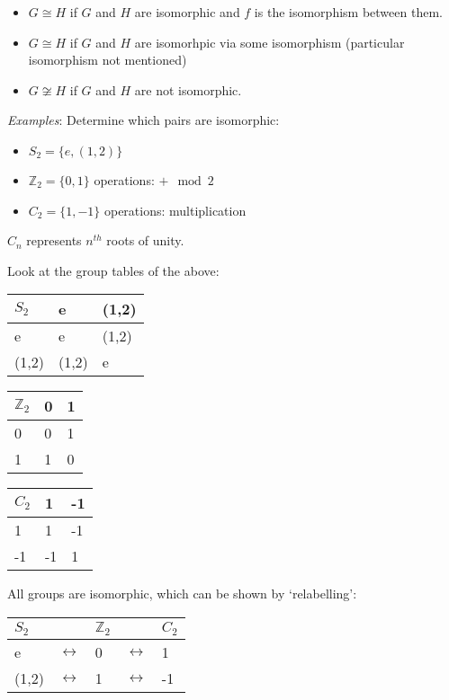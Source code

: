 \documentclass{article}
\theoremstyle{definition}
\newcommand{\ism}{\cong}
\begin{document}
\begin{itemize}
  \item 
$G \ism H$ if $G$ and $H$ are isomorphic and $f$ is the isomorphism between them.
  \item
$G \ism H$ if $G$ and $H$ are isomorhpic via some isomorphism (particular isomorphism not mentioned)
  \item 
$G \not\ism H$ if $G$ and $H$ are not isomorphic.
\end{itemize}

\emph{Examples}: Determine which pairs are isomorphic:

\begin{itemize}
  \item $S_2=\{e, (1, 2)\}$
  \item $\mathbb{Z}_2=\{0,1\}$ operations: $+\mod 2$
  \item $C_2=\{1,-1\}$ operations: multiplication
\end{itemize}
$C_n$ represents $n^{th}$ roots of unity.

Look at the group tables of the above:

\begin{table}[h]
  \centering
\label{my-label}
\begin{tabular}{l|ll}
$S_2$  & e     & (1,2) \\
\hline
e     & e     & (1,2) \\
(1,2) & (1,2) & e    
\end{tabular}
\end{table}

\begin{table}[h]
  \centering
\label{my-label}
\begin{tabular}{l|ll}
  $\mathbb{Z}_2$  & 0  & 1\\
\hline
0     & 0     & 1 \\
1 & 1 & 0    
\end{tabular}
\end{table}

\begin{table}[h]
  \centering
\label{my-label}
\begin{tabular}{l|ll}
  $C_2$  & 1  & -1\\
\hline
1     & 1  & -1 \\
-1    & -1 & 1    
\end{tabular}
\end{table}
All groups are isomorphic, which can be shown by `relabelling': 

\begin{table}[h]
  \centering
\label{my-label}
\begin{tabular}{lllll}
  $S_2$  &  & $\mathbb{Z}_2$ & & $C_2$\\
\hline
e     & $\leftrightarrow$ & 0 & $\leftrightarrow$ & 1 \\
(1,2) & $\leftrightarrow$ & 1 & $\leftrightarrow$ & -1    
\end{tabular}
\end{table}
\end{document}
